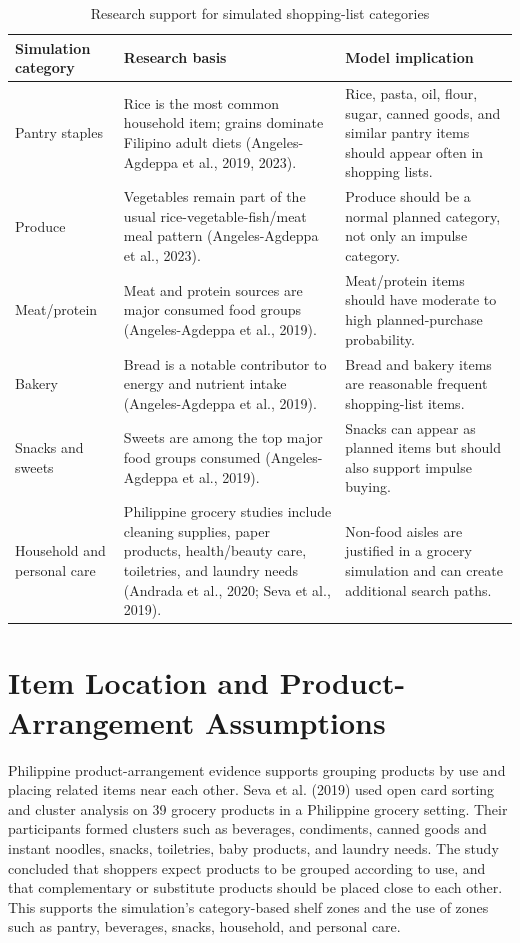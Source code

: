 \documentclass[12pt]{article}
\begin{document}
\begin{table}[h]
\centering
\caption{Research support for simulated shopping-list categories}
\begin{tabular}{>{\raggedright\arraybackslash}p{} >{\raggedright\arraybackslash}p{} >{\raggedright\arraybackslash}p{}}
\toprule
\textbf{Simulation category} & \textbf{Research basis} & \textbf{Model implication} \\
\midrule
Pantry staples & Rice is the most common household item; grains dominate Filipino adult diets (Angeles-Agdeppa et al., 2019, 2023). & Rice, pasta, oil, flour, sugar, canned goods, and similar pantry items should appear often in shopping lists. \\
Produce & Vegetables remain part of the usual rice-vegetable-fish/meat meal pattern (Angeles-Agdeppa et al., 2023). & Produce should be a normal planned category, not only an impulse category. \\
Meat/protein & Meat and protein sources are major consumed food groups (Angeles-Agdeppa et al., 2019). & Meat/protein items should have moderate to high planned-purchase probability. \\
Bakery & Bread is a notable contributor to energy and nutrient intake (Angeles-Agdeppa et al., 2019). & Bread and bakery items are reasonable frequent shopping-list items. \\
Snacks and sweets & Sweets are among the top major food groups consumed (Angeles-Agdeppa et al., 2019). & Snacks can appear as planned items but should also support impulse buying. \\
Household and personal care & Philippine grocery studies include cleaning supplies, paper products, health/beauty care, toiletries, and laundry needs (Andrada et al., 2020; Seva et al., 2019). & Non-food aisles are justified in a grocery simulation and can create additional search paths. \\
\bottomrule
\end{tabular}
\end{table}

\section{Item Location and Product-Arrangement Assumptions}

Philippine product-arrangement evidence supports grouping products by use and placing related items near each other. Seva et al. (2019) used open card sorting and cluster analysis on 39 grocery products in a Philippine grocery setting. Their participants formed clusters such as beverages, condiments, canned goods and instant noodles, snacks, toiletries, baby products, and laundry needs. The study concluded that shoppers expect products to be grouped according to use, and that complementary or substitute products should be placed close to each other. This supports the simulation's category-based shelf zones and the use of zones such as pantry, beverages, snacks, household, and personal care.
\end{document}
